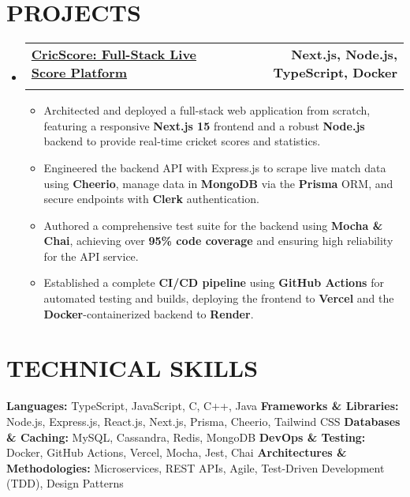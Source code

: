 \documentclass{fonts}
\makeatletter
\newcommand{\resumeSubheading}[4]{
  \vspace{-2pt}\item
    \begin{tabular*}{1.0\textwidth}[t]{l@{\extracolsep{\fill}}r}
      \textbf{\large#1} & \textbf{\small #2} \\
      \textit{\large#3} & \textit{\small #4} \\
    \end{tabular*}\vspace{-7pt}
}
\newcommand{\resumeItem}[1]{
  \item\small{
    {#1 \vspace{-2pt}}
  }
}
\newcommand{\resumeSubHeadingListStart}{\begin{itemize}[leftmargin=0.0in, label={}]}
\newcommand{\resumeSubHeadingListEnd}{\end{itemize}}
\newcommand{\resumeItemListStart}{\begin{itemize}}
\newcommand{\resumeItemListEnd}{\end{itemize}\vspace{-5pt}}
\makeatother
\begin{document}
\section{PROJECTS}
  \resumeSubHeadingListStart
    \resumeSubheading
      {\href{https://cricscore.deveshsangwan.com/}{CricScore: Full-Stack Live Score Platform \raisebox{-0.1\height}{\faLink}}}{Next.js, Node.js, TypeScript, Docker}{}{}
      \vspace{-10pt}
    \resumeItemListStart
        \resumeItem{Architected and deployed a full-stack web application from scratch, featuring a responsive \textbf{Next.js 15} frontend and a robust \textbf{Node.js} backend to provide real-time cricket scores and statistics.}
        \resumeItem{Engineered the backend API with Express.js to scrape live match data using \textbf{Cheerio}, manage data in \textbf{MongoDB} via the \textbf{Prisma} ORM, and secure endpoints with \textbf{Clerk} authentication.}
        \resumeItem{Authored a comprehensive test suite for the backend using \textbf{Mocha \& Chai}, achieving over \textbf{95\% code coverage} and ensuring high reliability for the API service.}
        \resumeItem{Established a complete \textbf{CI/CD pipeline} using \textbf{GitHub Actions} for automated testing and builds, deploying the frontend to \textbf{Vercel} and the \textbf{Docker}-containerized backend to \textbf{Render}.}
    \resumeItemListEnd
  \resumeSubHeadingListEnd

\section{TECHNICAL SKILLS}
    \small{
    \textbf{Languages:} TypeScript, JavaScript, C, C++, Java \newline
    \textbf{Frameworks \& Libraries:} Node.js, Express.js, React.js, Next.js, Prisma, Cheerio, Tailwind CSS \newline
    \textbf{Databases \& Caching:} MySQL, Cassandra, Redis, MongoDB \newline
    \textbf{DevOps \& Testing:} Docker, GitHub Actions, Vercel, Mocha, Jest, Chai \newline
    \textbf{Architectures \& Methodologies:} Microservices, REST APIs, Agile, Test-Driven Development (TDD), Design Patterns
    }

\end{document}
